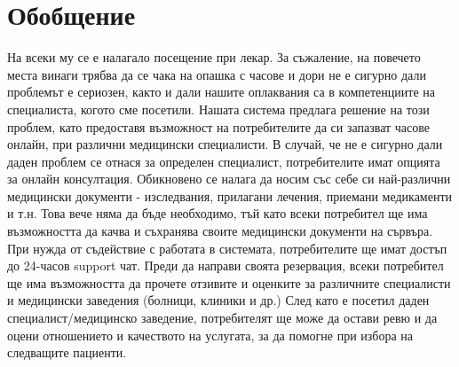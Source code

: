 \documentclass[a4paper,12pt]{article}
\begin{document}
\section{Обобщение}
На всеки му се е налагало посещение при лекар. За съжаление, на повечето места винаги трябва да се чака на опашка с часове и дори не е сигурно дали проблемът е сериозен, както и дали нашите оплаквания са в компетенциите на специалиста, когото сме посетили. Нашата система предлага решение на този проблем, като предоставя възможност на потребителите да си запазват часове онлайн, при различни медицински специалисти. В случай, че не е сигурно дали даден проблем се отнася за определен специалист, потребителите имат опцията за онлайн консултация. Обикновено се налага да носим със себе си най-различни медицински документи - изследвания, прилагани лечения, приемани медикаменти и т.н. Това вече няма да бъде необходимо, тъй като всеки потребител ще има възможността да качва и съхранява своите медицински документи на сървъра. При нужда от съдействие с работата в системата, потребителите ще имат достъп до 24-часов support чат.  Преди да направи своята резервация, всеки потребител ще има възможността да прочете отзивите и оценките за различните специалисти и медицински заведения (болници, клиники и др.) След като е посетил даден специалист/медицинско заведение, потребителят ще може да остави ревю и да оцени отношението и качеството на услугата, за да помогне при избора на следващите пациенти.\\
\end{document}
